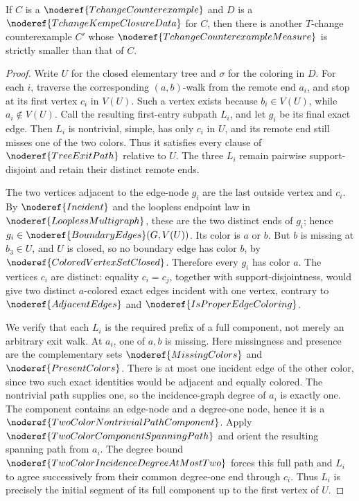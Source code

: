 \begin{lemma}
If \(C\) is a \(\noderef{TchangeCounterexample}\) and \(D\) is a
\(\noderef{TchangeKempeClosureData}\) for \(C\), then there is another
\(T\)-change counterexample \(C'\) whose
\(\noderef{TchangeCounterexampleMeasure}\) is strictly smaller than that
of \(C\).
\end{lemma}
\begin{proof}
Write \(U\) for the closed elementary tree and \(\sigma\) for the coloring
in \(D\).  For each \(i\), traverse the corresponding \((a,b)\)-walk from
the remote end \(a_i\), and stop at its first vertex \(c_i\) in \(V(U)\).
Such a vertex exists because \(b_i\in V(U)\), while \(a_i\notin V(U)\).
Call the resulting first-entry subpath \(L_i\), and let \(g_i\) be its
final exact edge.  Then \(L_i\) is nontrivial, simple, has only \(c_i\)
in \(U\), and its remote end still misses one of the two colors.  Thus it
satisfies every clause of \(\noderef{TreeExitPath}\) relative to \(U\).
The three \(L_i\) remain pairwise support-disjoint and retain their
distinct remote ends.

The two vertices adjacent to the edge-node \(g_i\) are the last outside
vertex and \(c_i\).  By \(\noderef{Incident}\) and the loopless endpoint
law in \(\noderef{LooplessMultigraph}\), these are the two distinct ends
of \(g_i\); hence
\(g_i\in\noderef{BoundaryEdges}(G,V(U))\).  Its color is \(a\) or \(b\).
But \(b\) is missing at \(b_3\in U\), and \(U\) is closed, so no boundary
edge has color \(b\), by \(\noderef{ColoredVertexSetClosed}\).
Therefore every \(g_i\) has color \(a\).
The vertices \(c_i\) are distinct: equality \(c_i=c_j\), together with
support-disjointness, would give two distinct \(a\)-colored exact edges
incident with one vertex, contrary to \(\noderef{AdjacentEdges}\) and
\(\noderef{IsProperEdgeColoring}\).

We verify that each \(L_i\) is the required prefix of a full component,
not merely an arbitrary exit walk.  At \(a_i\), one of \(a,b\) is missing.
Here missingness and presence are the complementary sets
\(\noderef{MissingColors}\) and \(\noderef{PresentColors}\).
There is at most one incident edge of the other color, since two such
exact identities would be adjacent and equally colored.  The nontrivial
path supplies one, so the incidence-graph degree of \(a_i\) is exactly
one.  The component contains an edge-node and a degree-one node, hence it
is a \(\noderef{TwoColorNontrivialPathComponent}\).  Apply
\(\noderef{TwoColorComponentSpanningPath}\) and orient the resulting
spanning path from \(a_i\).  The degree bound
\(\noderef{TwoColorIncidenceDegreeAtMostTwo}\) forces this full path and
\(L_i\) to agree successively from their common degree-one end through
\(c_i\).  Thus \(L_i\) is precisely the initial segment of its full
component up to the first vertex of \(U\).


\end{proof}
